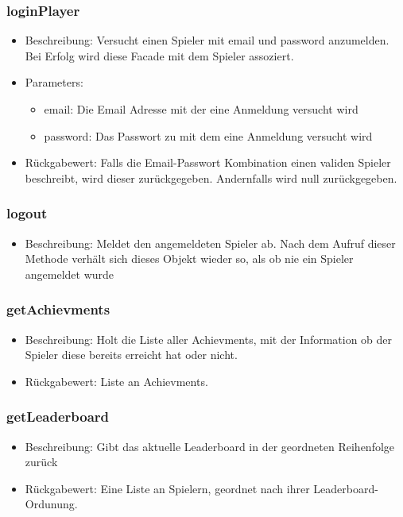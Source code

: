 \documentclass[a4paper]{scrreprt}
\begin{document}
    \subsubsection{loginPlayer}
        \begin{itemize}
            \item Beschreibung: Versucht einen Spieler mit email und password anzumelden. Bei Erfolg wird diese Facade mit dem Spieler assoziert.
            \item Parameters: 
                \begin{itemize}
                    \item email: Die Email Adresse mit der eine Anmeldung versucht wird
                    \item password: Das Passwort zu mit dem eine Anmeldung versucht wird
                \end{itemize}
            \item Rückgabewert: Falls die Email-Passwort Kombination einen validen Spieler beschreibt, wird dieser zurückgegeben. Andernfalls wird null zurückgegeben.
        \end{itemize}
    \subsubsection{logout}
    \begin{itemize}
        \item Beschreibung: Meldet den angemeldeten Spieler ab. Nach dem Aufruf dieser Methode verhält sich dieses Objekt wieder so, als ob nie ein Spieler angemeldet wurde
    \end{itemize}
    \subsubsection{getAchievments}
    \begin{itemize}
        \item Beschreibung: Holt die Liste aller Achievments, mit der Information ob der Spieler diese bereits erreicht hat oder nicht.
        \item Rückgabewert: Liste an Achievments. 
    \end{itemize}
    \subsubsection{getLeaderboard}
    \begin{itemize}
        \item Beschreibung: Gibt das aktuelle Leaderboard in der geordneten Reihenfolge zurück
        \item Rückgabewert: Eine Liste an Spielern, geordnet nach ihrer Leaderboard-Ordunung. 
    \end{itemize}
\end{document}
